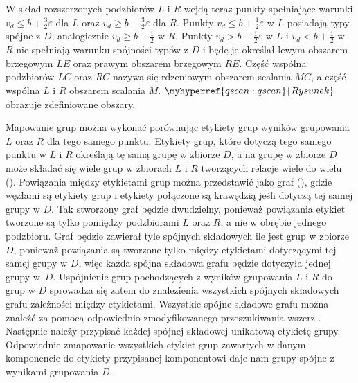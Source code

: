 W skład rozszerzonych podzbiorów $ L $ i $ R $ wejdą teraz punkty spełniające warunki $ v_d \le b + \frac{3}{2}\varepsilon $ dla $ L $ oraz $ v_d \ge b - \frac{3}{2}\varepsilon $ dla $ R $. Punkty $ v_d \le b + \frac{1}{2}\varepsilon $ w $ L $ posiadają typy spójne z $ D $, analogicznie $ v_d \ge b - \frac{1}{2} $ w $ R $. Punkty $ v_d > b - \frac{1}{2}\varepsilon $ w $ L $ i $ v_d < b + \frac{1}{2} $ w $ R $ nie spełniają warunku spójności typów z $ D $ i będę je określał lewym obszarem brzegowym $ LE $ oraz prawym obszarem brzegowym $ RE $. Część wspólna podzbiorów $ LC $ oraz $ RC $ nazywa się rdzeniowym obszarem scalania $ MC $, a część wspólna $ L $ i $ R $ obszarem scalania $ M $. $ \myhyperref{qscan:qscan}{Rysunek} $ obrazuje zdefiniowane obszary.\par

Mapowanie grup można wykonać porównując etykiety grup wyników grupowania $ L $ oraz $ R $ dla tego samego punktu. Etykiety grup, które dotyczą tego samego punktu w $ L $ i $ R $ określają tę samą grupę w zbiorze $ D $, a na grupę w zbiorze $ D $ może składać się wiele grup w zbiorach $ L $ i $ R $ tworzących relacje wiele do wielu (). Powiązania między etykietami grup można przedstawić jako graf (), gdzie węzłami są etykiety grup i etykiety połączone są krawędzią jeśli dotyczą tej samej grupy w $ D $. Tak stworzony graf będzie dwudzielny, ponieważ powiązania etykiet tworzone są tylko pomiędzy podzbiorami $ L $ oraz $ R $, a nie w obrębie jednego podzbioru. Graf będzie zawierał tyle spójnych składowych ile jest grup w zbiorze $ D $, ponieważ powiązania są tworzone tylko między etykietami dotyczącymi tej samej grupy w $ D $, więc każda spójna składowa grafu będzie dotyczyła jednej grupy \mbox{w $ D $}. Uspójnienie grup pochodzących z wyników grupowania $ L $ i $ R $ do grup w $ D $ sprowadza się zatem do znalezienia wszystkich spójnych składowych grafu zależności między etykietami. Wszystkie spójne składowe grafu można znaleźć za pomocą odpowiednio zmodyfikowanego przeszukiwania wszerz \cite{connectedcomponentsbfs}. Następnie należy przypisać każdej spójnej składowej unikatową etykietę grupy. Odpowiednie zmapowanie wszystkich etykiet grup zawartych w danym komponencie do etykiety przypisanej komponentowi daje nam grupy spójne z wynikami grupowania $ D $.\par


